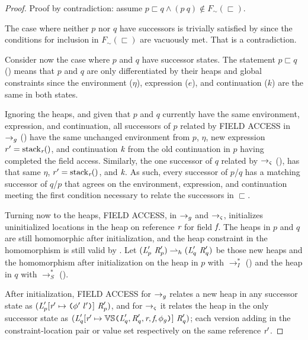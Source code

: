 \begin{proof}
Proof by contradiction: assume $p \sqsubset q \wedge (p\ q) \not\in F_\sim(\sqsubset)$. 

The case where neither $p$ nor $q$ have successors is trivially satisfied by
 since the conditions for inclusion in
$F_\sim(\sqsubset)$ are vacuously met. That is a contradiction.

Consider now the case where $p$ and $q$ have successor states. The
statement $p \sqsubset q$ () means that $p$ and
$q$ are only differentiated by their heaps and global constraints
since the environment ($\eta$), expression ($e$), and continuation
($k$) are the same in both states.

Ignoring the heaps, and given that $p$ and $q$ currently have
the same environment, expression, and continuation, all successors
of $p$ related by \textrm{F{\footnotesize IELD}}
\textrm{A{\footnotesize CCESS}} in $\rightarrow_{g}$ () have
the same unchanged environment from $p$, $\eta$, new expression
$r^\prime = \mathrm{stack}_{\emph{r}}()$, and continuation $\emph{k}$
from the old continuation in $p$ having completed the field
access. Similarly, the one successor of $q$ related by $\rightarrow_{\varsigma}$
(), has that same $\eta$, $r^\prime =
\mathrm{stack}_{\emph{r}}()$, and $\emph{k}$. As such, every successor
of $p$/$q$ has a matching successor of $q$/$p$ that agrees on the
environment, expression, and continuation meeting the first condition
necessary to relate the successors in $\sqsubset$.

Turning now to the heaps, \textrm{F{\footnotesize IELD}}
\textrm{A{\footnotesize CCESS}}, in $\rightarrow_{g}$ and $\rightarrow_{\varsigma}$, initializes
uninitialized locations in the heap on reference $\emph{r}$ for field
$\emph{f}$. The heaps in $p$ and $q$ are still homomorphic after
initialization, and the heap constraint in the homomorphism is still
valid by . Let
$(\emph{L}^\prime_p\ \emph{R}^\prime_p) \rightharpoonup_h
(\emph{L}^\prime_q\ \emph{R}^\prime_q)$ be those new heaps and
the homomorphism after initialization on the heap in $p$ with
$\rightarrow_I^*$ () and the heap in $q$ with
$\rightarrow_S^*$ ().

After initialization, \textrm{F{\footnotesize IELD}}
\textrm{A{\footnotesize CCESS}} for $\rightarrow_{g}$ relates a new heap in any
successor state as $(\emph{L}^\prime_p [\emph{r}^\prime \mapsto
  \texttt{(}\phi^\prime\ l^\prime\texttt{)}]\ \emph{R}^\prime_p)$, and for $\rightarrow_{\varsigma}$ it
relates the heap in the only successor state as $(\emph{L}^\prime_q[\emph{r}^\prime \mapsto
  \mathbb{VS}\texttt{(}
  \emph{L}^\prime_q,\emph{R}^\prime_q,\emph{r},\emph{f},\phi_g\texttt{)}
]\ \emph{R}^\prime_q)$; each version adding in the constraint-location pair or
value set respectively on the same reference $\emph{r}^\prime$.


\end{proof}
